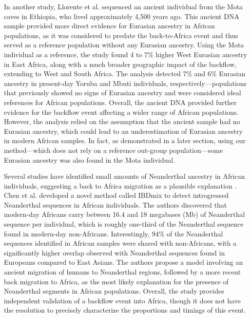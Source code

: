 In another study, Llorente et al. \cite{llorente2015ancient} sequenced an ancient individual from the Mota caves in Ethiopia, who lived approximately 4,500 years ago. %
This ancient DNA sample provided more direct evidence for Eurasian ancestry in African populations, as it was considered to predate the back-to-Africa event and thus served as a reference population without any Eurasian ancestry. Using the Mota individual as a reference, the study found 4 to 7\% higher West Eurasian ancestry in East Africa, along with a much broader geographic impact of the backflow, extending to West and South Africa. The analysis detected 7\% and 6\% Eurasian ancestry in present-day Yoruba and Mbuti individuals, respectively---populations that previously showed no signs of Eurasian ancestry and were considered ideal references for African populations. Overall, the ancient DNA provided further evidence for the backflow event affecting a wider range of African populations. However, the analysis relied on the assumption that the ancient sample had no Eurasian ancestry, which could lead to an underestimation of Eurasian ancestry in modern African samples. In fact, as demonstrated in a later section, using our method---which does not rely on a reference out-group population---some Eurasian ancestry was also found in the Mota individual.

Several studies have identified small amounts of Neanderthal ancestry in African individuals, suggesting a back to Africa migration as a plausible explanation \cite{chen2020identifying,vernot2016excavating}. 
%
Chen et al. \cite{chen2020identifying} developed a novel method called IBDmix to detect introgressed Neanderthal sequences in African individuals. The authors discovered that modern-day Africans carry between 16.4 and 18 megabases (Mb) of Neanderthal sequence per individual, which is roughly one-third of the Neanderthal sequence found in modern-day non-Africans. 
%
Interestingly, 94\% of the Neanderthal sequences identified in African samples were shared with non-Africans, with a significantly higher overlap observed with Neanderthal sequences found in Europeans compared to East Asians.
%
The authors propose a model involving an ancient migration of humans to Neanderthal regions, followed by a more recent back migration to Africa, as the most likely explanation for the presence of Neanderthal segments in African populations.
%
Overall, the study provides independent validation of a backflow event into Africa, though it does not have the resolution to precisely characterize the proportions and timings of this event.

